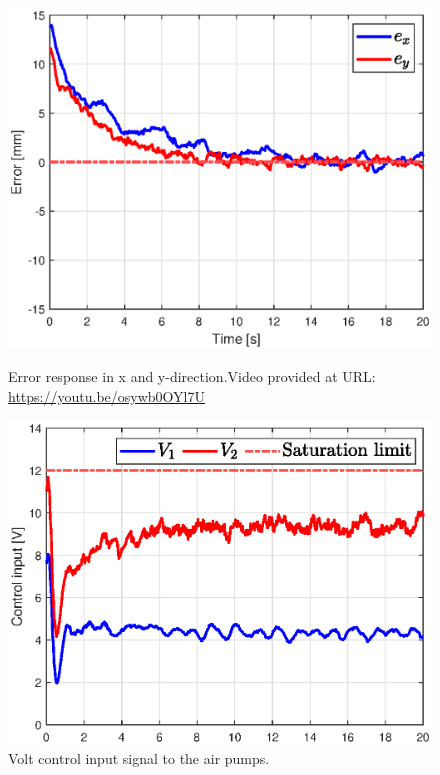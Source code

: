 \begin{figure}[H] 
    \begin{minipage}[b]{0.49\linewidth}
     \centering
    \includegraphics[width=\linewidth]{Figures/Chapter5/errorstepright.eps} 
    \caption{Error response in x and y-direction.Video provided at URL: \url{https://youtu.be/osywb0OYl7U}} 
    \label{fig5:errorswingright} 
       \end{minipage} 
    \begin{minipage}[b]{0.49\linewidth}
     \centering
    \includegraphics[width=\linewidth]{Figures/Chapter5/controlinputsteprightV.eps} 
    \caption{Volt control input signal to the air pumps.} 
    \label{fig5:inputswingright} 
    \end{minipage} 
\end{figure}




